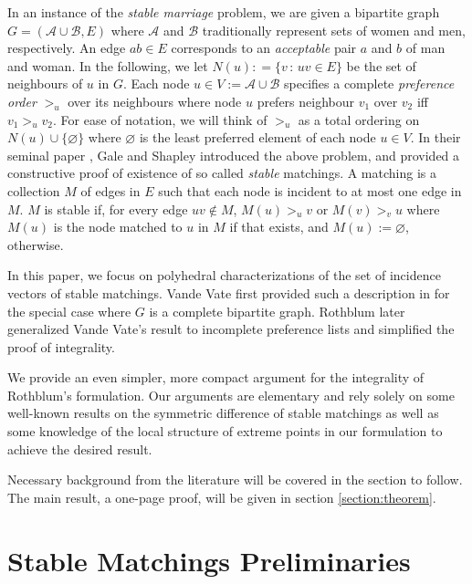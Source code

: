 \documentclass[3p,times]{elsarticle}
\newcommand{\cA}{\mathcal{A}} \newcommand{\cB}{\mathcal{B}}
\begin{document}
In an instance of the {\em stable marriage} problem, we are given a
bipartite graph $G=(\cA \cup \cB, E)$ where $\cA$ and $\cB$
traditionally represent sets of women and men, respectively. An edge
$ab \in E$ corresponds to an {\em acceptable} pair $a$ and $b$ of man
and woman. In the following, we let $N(u): = \{ v \,:\, uv \in E \}$ be
the set of neighbours of $u$ in $G$. Each node
$u \in V:=\cA \cup \cB$ specifies a complete {\em preference order}
$>_u$ over its neighbours where node $u$ prefers neighbour $v_1$
over $v_2$ iff $v_1 >_u v_2$. For ease of notation, we will think of $>_u$ as a total
ordering on $N(u) \cup \{\varnothing\}$ where 
$\varnothing$ is the least preferred element of each node $u \in V$. In their seminal paper
\cite{gale1962college}, Gale and Shapley introduced the above problem,
and provided a constructive proof of existence of so called {\em
  stable} matchings. A matching is a collection $M$ of edges in $E$
such that each node is incident to at most one edge in $M$. $M$ is
stable if, for every edge $uv \not\in M$, $M(u) >_u v$ or $M(v) >_v u$ where
$M(u)$ is the node matched to $u$ in $M$ if that exists, and
$M(u):=\varnothing$, otherwise. 

In this paper, we focus on polyhedral characterizations of the set of
incidence vectors of stable matchings.  Vande Vate first provided such
a description in \cite{vate1989linear} for the special case where $G$
is a complete bipartite graph.  Rothblum
\cite{rothblum1992characterization} later generalized Vande Vate's
result to incomplete preference lists and simplified the proof of
integrality.

We provide an even simpler, more compact argument for the integrality
of Rothblum's formulation. Our arguments are elementary and
rely solely on some well-known results on the symmetric difference
of stable matchings as well as some knowledge of the local structure
of extreme points in our formulation to achieve the desired result.

Necessary background from the literature will be covered in the section to follow. The main result, a one-page proof, will be given in section \ref{section:theorem}.

\section{Stable Matchings Preliminaries}
\end{document}
